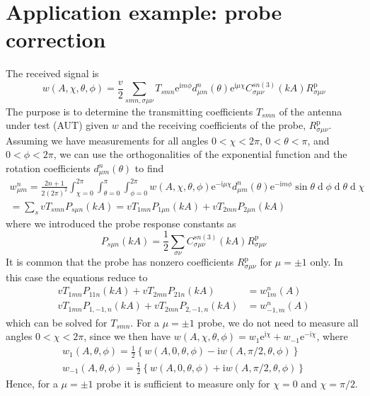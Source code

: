 \documentclass[a4paper,12pt]{article}
\newcommand{\mrm}[1]{\mathrm{#1}}
\newcommand{\diff}{\operatorname{d}\!}
\newcommand{\iu}{\mrm{i}}
\newcommand{\eu}{\mrm{e}}
\begin{document}
\section{Application example: probe correction}

The received signal is \cite[Eq. (3.10)]{Hansen1988}
\begin{equation}
  w(A,\chi,\theta,\phi) = \frac{v}{2}\sum_{smn,\sigma\mu\nu} T_{smn}\eu^{\iu m\phi} d_{\mu m}^{n}(\theta) \eu^{\iu\mu\chi} C_{\sigma\mu\nu}^{sn(3)}(kA) R_{\sigma\mu\nu}^{\mrm{p}}
  \label{eq:transmissionformula}
\end{equation}
The purpose is to determine the transmitting coefficients $T_{smn}$ of
the antenna under test (AUT) given $w$ and the receiving coefficients
of the probe, $R_{\sigma\mu\nu}^{\mrm{p}}$. Assuming we have
measurements for all angles $0<\chi<2\pi$, $0<\theta<\pi$, and
$0<\phi<2\pi$, we can use the orthogonalities of the exponential
function and the rotation coefficients $d_{\mu m}^{n}(\theta)$ to find
\cite[Eqns. (4.51), (4.52)]{Hansen1988}
\begin{multline}
  w_{\mu m}^{n} = \frac{2n+1}{2(2\pi)^{2}}\int_{\chi=0}^{2\pi}\int_{\theta=0}^{\pi}\int_{\phi=0}^{2\pi} w(A,\chi,\theta,\phi) \eu^{-\iu\mu\chi}d_{\mu m}^{n}(\theta)\eu^{-\iu m\phi} \sin\theta\diff\phi\diff\theta\diff\chi \\
  = \sum_{s} vT_{smn}P_{s\mu n}(kA) = vT_{1mn}P_{1\mu n}(kA) + vT_{2mn}P_{2\mu n}(kA)
\end{multline}
where we introduced the probe response constants as
\begin{equation}
  P_{s\mu n}(kA) = \frac{1}{2}\sum_{\sigma\nu}C_{\sigma\mu\nu}^{sn(3)}(kA)R_{\sigma\mu\nu}^{\mrm{p}}
\end{equation}
It is common that the probe has nonzero coefficients
$R_{\sigma\mu\nu}^{\mrm{p}}$ for $\mu=\pm1$ only. In this case the
equations reduce to
\begin{align}
  vT_{1mn}P_{11n}(kA) + vT_{2mn}P_{21n}(kA) &= w_{1m}^{n}(A) \\
  vT_{1mn}P_{1,-1,n}(kA) + vT_{2mn}P_{2,-1,n}(kA) &= w_{-1,m}^{n}(A)
\end{align}
which can be solved for $T_{smn}$. For a $\mu=\pm1$ probe, we do not
need to measure all angles $0<\chi<2\pi$, since we then have
$w(A,\chi,\theta,\phi) = w_{1}\eu^{\iu\chi} + w_{-1}\eu^{-\iu\chi}$,
where \cite[p. 110]{Hansen1988}
\begin{align}
  w_{1}(A,\theta,\phi) = \frac{1}{2} \left\{ w(A,0,\theta,\phi) - \iu w(A,\pi/2,\theta,\phi) \right\} \\
  w_{-1}(A,\theta,\phi) = \frac{1}{2} \left\{ w(A,0,\theta,\phi) + \iu w(A,\pi/2,\theta,\phi) \right\} 
\end{align}
Hence, for a $\mu=\pm1$ probe it is sufficient to measure only for
$\chi=0$ and $\chi=\pi/2$.
\end{document}
